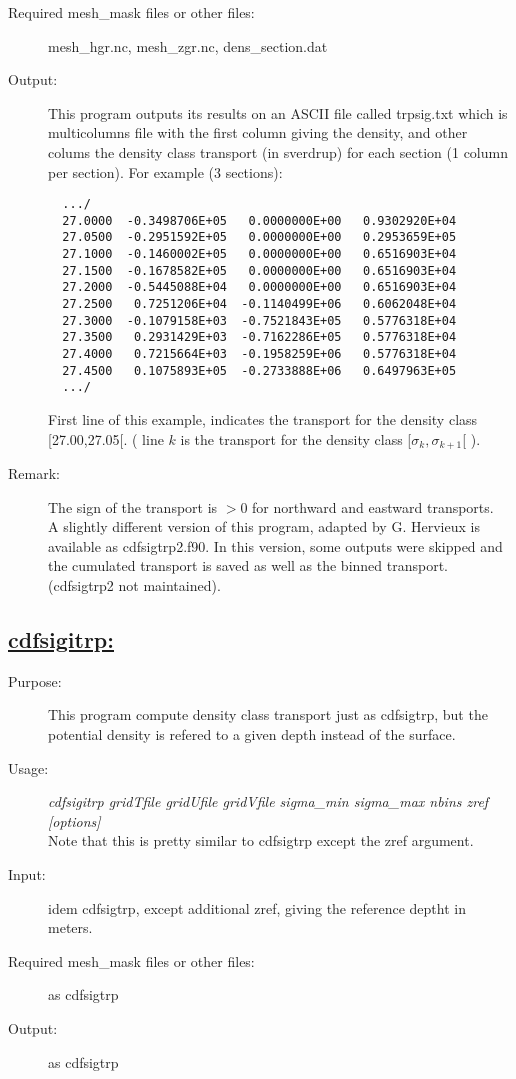 \documentclass[a4paper,11pt]{article}
\begin{document}
\begin{description}
\item[Required mesh\_mask files or other files:]   mesh\_hgr.nc, mesh\_zgr.nc, dens\_section.dat
\item[Output:] This program outputs its results on  an ASCII file called trpsig.txt which is multicolumns file with the first column
giving the density, and other colums the density class transport (in sverdrup) for each section (1 column per section). For example (3 sections):
\begin{scriptsize}
\begin{verbatim}
  .../
  27.0000  -0.3498706E+05   0.0000000E+00   0.9302920E+04
  27.0500  -0.2951592E+05   0.0000000E+00   0.2953659E+05
  27.1000  -0.1460002E+05   0.0000000E+00   0.6516903E+04
  27.1500  -0.1678582E+05   0.0000000E+00   0.6516903E+04
  27.2000  -0.5445088E+04   0.0000000E+00   0.6516903E+04
  27.2500   0.7251206E+04  -0.1140499E+06   0.6062048E+04
  27.3000  -0.1079158E+03  -0.7521843E+05   0.5776318E+04
  27.3500   0.2931429E+03  -0.7162286E+05   0.5776318E+04
  27.4000   0.7215664E+03  -0.1958259E+06   0.5776318E+04
  27.4500   0.1075893E+05  -0.2733888E+06   0.6497963E+05
  .../
\end{verbatim}
\end{scriptsize}
First line of this example, indicates the transport for the density class [27.00,27.05[. ( line $k$ is the transport for the density class
[$\sigma_k, \sigma_{k+1}$[ ).

\item[Remark:]  The sign of the transport is $>0$ for northward and eastward transports. \\
    A slightly different version of this program, adapted by G. Hervieux is available as cdfsigtrp2.f90. In this version, some outputs were skipped and the cumulated
transport is saved as well as the binned transport. (cdfsigtrp2 not maintained).
\end{description}

\subsection*{\underline{cdfsigitrp:}}
\begin{description}
\item[Purpose:] This program compute density class transport just as cdfsigtrp, but the potential density is refered to a given depth instead of the surface. 
\item[Usage:] {\em cdfsigitrp  gridTfile  gridUfile gridVfile   sigma\_min sigma\_max nbins zref [options] } \\
   Note that this is pretty similar to cdfsigtrp except the zref argument.
\item[Input:]  idem cdfsigtrp, except additional zref, giving the reference deptht in meters.
\item[Required mesh\_mask files or other files:] as cdfsigtrp
\item[Output:]  as cdfsigtrp
\end{description}
\end{document}
